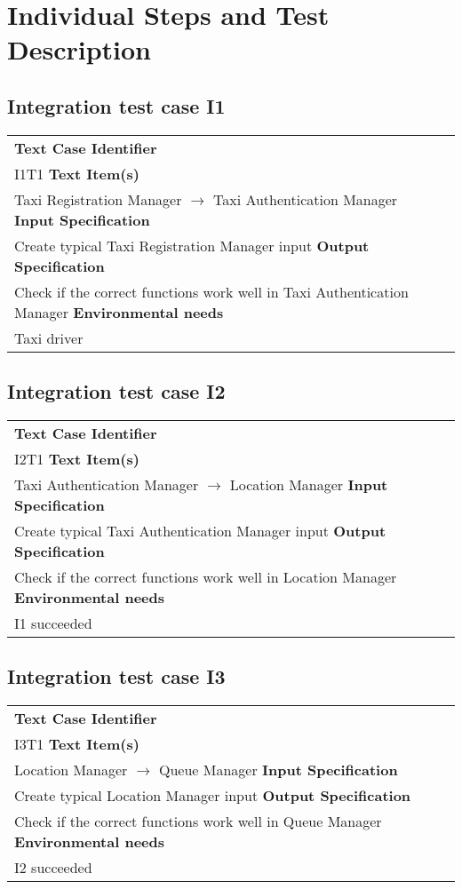 \section{Individual Steps and Test Description}
\subsection{Integration test case I1}
	\begin{tabular} {l p{7cm}}
		\hline \textbf{Text Case Identifier} & \\ I1T1
		\hline \textbf{Text Item(s)} & \\ Taxi Registration Manager $\rightarrow$ Taxi Authentication Manager  
		\hline \textbf{Input Specification} & \\ Create typical Taxi Registration Manager input 
		\hline \textbf{Output Specification} & \\ Check if the correct functions work well in Taxi Authentication Manager 
		\hline \textbf{Environmental needs} & \\ Taxi driver
		\hline 
	\end{tabular}
\subsection{Integration test case I2}
	\begin{tabular} {l p{9cm}}
		\hline \textbf{Text Case Identifier} & \\ I2T1
		\hline \textbf{Text Item(s)} & \\ Taxi Authentication Manager $\rightarrow$ Location Manager
		\hline \textbf{Input Specification} & \\ Create typical Taxi Authentication Manager input
		\hline \textbf{Output Specification} & \\ Check if the correct functions work well in Location Manager
		\hline \textbf{Environmental needs} & \\ I1 succeeded
		\hline 
	\end{tabular}
\subsection{Integration test case I3}
	\begin{tabular} {l p{9cm}}
		\hline \textbf{Text Case Identifier} & \\ I3T1
		\hline \textbf{Text Item(s)} & \\ Location Manager $\rightarrow$ Queue Manager
		\hline \textbf{Input Specification} & \\ Create typical Location Manager input
		\hline \textbf{Output Specification} & \\ Check if the correct functions work well in Queue Manager
		\hline \textbf{Environmental needs} & \\ I2 succeeded
		\hline 
	\end{tabular}

